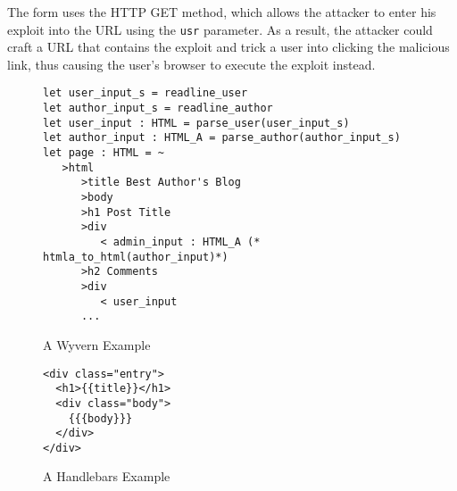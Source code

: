The form uses the HTTP GET method, which allows the attacker to enter
his exploit into the URL using the \texttt{usr} parameter. As a
result, the attacker could craft a URL that contains the exploit and
trick a user into clicking the malicious link, thus causing the user's
browser to execute the exploit instead.


\begin{figure}
\begin{lstlisting}
let user_input_s = readline_user
let author_input_s = readline_author
let user_input : HTML = parse_user(user_input_s)
let author_input : HTML_A = parse_author(author_input_s)
let page : HTML = ~
   >html
      >title Best Author's Blog
      >body
      >h1 Post Title
      >div
         < admin_input : HTML_A (* htmla_to_html(author_input)*)
      >h2 Comments
      >div
         < user_input
      ... 
\end{lstlisting}
\caption{A Wyvern Example}
\label{fig:wyvern-example}
\end{figure}

\begin{figure}
\begin{lstlisting}
<div class="entry">
  <h1>{{title}}</h1>
  <div class="body">
    {{{body}}}
  </div>
</div>
\end{lstlisting}
\caption{A Handlebars Example}
\label{fig:handlebars-example}
\end{figure}


